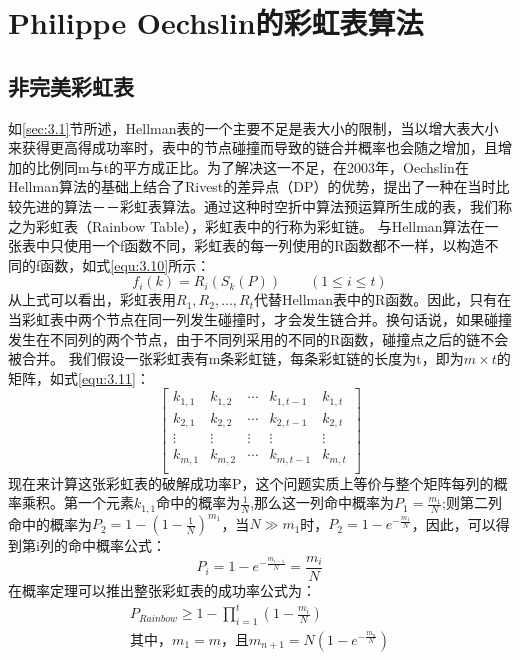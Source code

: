 \section{Philippe Oechslin的彩虹表算法}
\label{sec:3.3}
	\subsection{非完美彩虹表}
如\ref{sec:3.1}节所述，Hellman表的一个主要不足是表大小的限制，当以增大表大小来获得更高得成功率时，表中的节点碰撞而导致的链合并概率也会随之增加，且增加的比例同m与t的平方成正比。为了解决这一不足，在2003年，Oechslin在Hellman算法的基础上结合了Rivest的差异点（DP）的优势，提出了一种在当时比较先进的算法－－彩虹表算法\cite{PO}。通过这种时空折中算法预运算所生成的表，我们称之为彩虹表（Rainbow Table），彩虹表中的行称为彩虹链。
与Hellman算法在一张表中只使用一个f函数不同，彩虹表的每一列使用的R函数都不一样，以构造不同的f函数，如式\eqref{equ:3.10}所示：
\begin{equation}
\label{equ:3.10}
f_i(k)=R_i(S_k(P)) \quad \quad  (1\leq i \leq t) 
\end{equation}
从上式可以看出，彩虹表用$R_1,R_2,\ldots ,R_t$代替Hellman表中的R函数。因此，只有在当彩虹表中两个节点在同一列发生碰撞时，才会发生链合并。换句话说，如果碰撞发生在不同列的两个节点，由于不同列采用的不同的R函数，碰撞点之后的链不会被合并。
我们假设一张彩虹表有m条彩虹链，每条彩虹链的长度为t，即为$m\times t$的矩阵，如式\eqref{equ:3.11}：
\begin{equation}
\label{equ:3.11}
\begin{bmatrix}
k_{1,1} & k_{1,2} & \cdots & k_{1,t-1} & k_{1,t} \\
k_{2,1} & k_{2,2} & \cdots & k_{2,t-1} & k_{2,t} \\
\vdots & \vdots & \vdots & \vdots & \vdots \\
k_{m,1} & k_{m,2} & \cdots & k_{m,t-1} & k_{m,t} \\
\end{bmatrix}
\end{equation}
现在来计算这张彩虹表的破解成功率P，这个问题实质上等价与整个矩阵每列的概率乘积。第一个元素$k_{1,1}$命中的概率为$\frac{1}{N}$,那么这一列命中概率为$P_1=\frac{m_{1}}{N}$;则第二列命中的概率为$P_2=1-(1-\frac{1}{N})^{m_1}$，当$N\gg m_{1}$时，$P_2=1-e^{-\tfrac{m_1}N{}}$，因此，可以得到第i列的命中概率公式：
\begin{equation}
P_i=1-e^{-\tfrac{m_{i-1}}{N}}=\frac{m_i}{N}
\end{equation}
在概率定理可以推出整张彩虹表的成功率公式为：
\begin{eqnarray}
\label{equ:3.12}
P_{Rainbow} \ge 1-\prod^{t}_{i=1}\left(1-\frac{m_{i}}{N}\right) \nonumber\\
\text{其中，} m_{1}=m \text{，且} m_{n+1} = N\left(1-e^{-\tfrac{m_{n}}{N}}\right)
\end{eqnarray}

